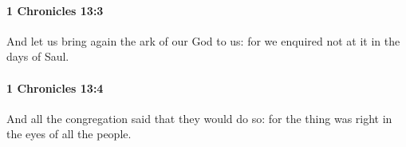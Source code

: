 		\paragraph{1 Chronicles 13:3} %
			\label{1CHRONICLES-13-3}

			And let us bring again the ark of our God to us: for we enquired not at it in the days of Saul.


		\paragraph{1 Chronicles 13:4} %
			\label{1CHRONICLES-13-4}

			And all the congregation said that they would do so: for the thing was right in the eyes of all the people.



